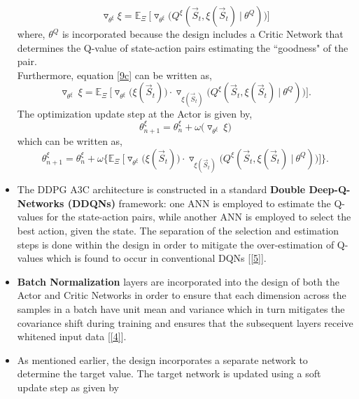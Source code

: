 \documentclass{article}
\begin{document}
\begin{itemize}
    \begin{equation}\label{9c}
        \triangledown_{\theta^{\xi}} \xi = \mathbb{E}_{\Xi}\ \Big[\triangledown_{\theta^{\xi}}\Big(Q^{\xi}(\vec{S}_t, \xi(\vec{S}_{t})\ |\ \theta^{Q})\Big)\Big]
    \end{equation}
    where, $\theta^{Q}$ is incorporated because the design includes a Critic Network that determines the Q-value of state-action pairs estimating the ``goodness" of the pair.
    \\Furthermore, equation \eqref{9c} can be written as,
    \begin{equation}\label{9d}
        \triangledown_{\theta^{\xi}}\ \xi = \mathbb{E}_{\Xi}\ \Big[\triangledown_{\theta^{\xi}} \Big(\xi(\vec{S}_t)\Big) \cdot \triangledown_{\xi(\vec{S}_t)} \Big(Q^{\xi}(\vec{S}_t, \xi(\vec{S}_t)\ |\ \theta^{Q})\Big)\Big].
    \end{equation}
    The optimization update step at the Actor is given by,
    \begin{equation}
        \theta^{\xi}_{n+1} = \theta^{\xi}_{n} + \omega\Big(\triangledown_{\theta^{\xi}}\ \xi\Big)
    \end{equation}
    which can be written as,
    \begin{equation}
        \theta^{\xi}_{n+1} = \theta^{\xi}_{n} + \omega \Big\{\mathbb{E}_{\Xi}\ \Big[\triangledown_{\theta^{\xi}} \Big(\xi(\vec{S}_t)\Big) \cdot \triangledown_{\xi(\vec{S}_t)} \Big(Q^{\xi}(\vec{S}_t, \xi(\vec{S}_t)\ |\ \theta^{Q})\Big)\Big]\Big\}.
    \end{equation}
    \item The DDPG A3C architecture is constructed in a standard \textbf{Double Deep-Q-Networks (DDQNs)} framework: one ANN is employed to estimate the Q-values for the state-action pairs, while another ANN is employed to select the best action, given the state. The separation of the selection and estimation steps is done within the design in order to mitigate the over-estimation of Q-values which is found to occur in conventional DQNs [\ref{5}].
    \item \textbf{Batch Normalization} layers are incorporated into the design of both the Actor and Critic Networks in order to ensure that each dimension across the samples in a batch have unit mean and variance which in turn mitigates the covariance shift during training and ensures that the subsequent layers receive whitened input data [\ref{4}].
    \item As mentioned earlier, the design incorporates a separate network to determine the target value. The target network is updated using a soft update step as given by

\end{itemize}
\end{document}
